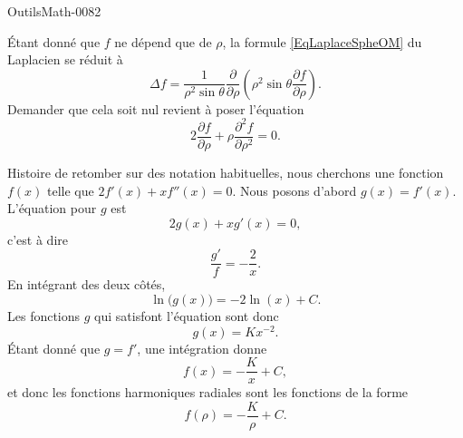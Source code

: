 
\begin{corrige}{OutilsMath-0082}

    Étant donné que $f$ ne dépend que de $\rho$, la formule \eqref{EqLaplaceSpheOM} du Laplacien se réduit à
    \begin{equation}
        \Delta f=\frac{1}{ \rho^2\sin\theta }\frac{ \partial  }{ \partial \rho }\left( \rho^2\sin\theta\frac{ \partial f }{ \partial \rho } \right).
    \end{equation}
    Demander que cela soit nul revient à poser l'équation
    \begin{equation}
        2\frac{ \partial f }{ \partial \rho }+\rho\frac{ \partial^2f }{ \partial \rho^2 }=0.
    \end{equation}
    
    Histoire de retomber sur des notation habituelles, nous cherchons une fonction $f(x)$ telle que $2f'(x)+xf''(x)=0$. Nous posons d'abord $g(x)=f'(x)$. L'équation pour $g$ est
    \begin{equation}
        2g(x)+xg'(x)=0,
    \end{equation}
    c'est à dire
    \begin{equation}
        \frac{ g' }{ f }=-\frac{ 2 }{ x }.
    \end{equation}
    En intégrant des deux côtés,
    \begin{equation}
        \ln\big( g(x) \big)=-2\ln(x)+C.
    \end{equation}
    Les fonctions $g$ qui satisfont l'équation sont donc
    \begin{equation}
        g(x)=Kx^{-2}.
    \end{equation}
    Étant donné que $g=f'$, une intégration donne
    \begin{equation}
        f(x)=-\frac{ K }{ x }+C,
    \end{equation}
    et donc les fonctions harmoniques radiales sont les fonctions de la forme
    \begin{equation}
        f(\rho)=-\frac{ K }{ \rho }+C.
    \end{equation}

\end{corrige}
